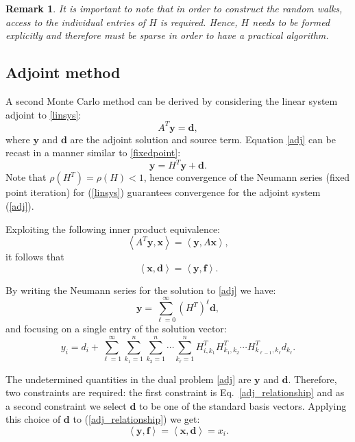 \documentclass[times]{nlaauth}
\newtheorem{rem}{Remark}
\begin{document}
\begin{rem}
It is important to note that in order to construct the random walks,
access to the individual entries of $H$ is required. Hence, $H$ needs to be formed explicitly
and therefore must be sparse in order to have a practical algorithm.
\end{rem}

\subsection{Adjoint method}
\label{subsec:adjoint}

A second Monte Carlo method can be derived by considering the linear system
adjoint to \eqref{linsys}:
\begin{equation}
A^T\mathbf{y}=\mathbf{d},
\label{adj}
\end{equation}
where $\mathbf{y}$ and $\mathbf{d}$ are the adjoint solution and source term.
Equation \eqref{adj} can be recast in a manner similar to \eqref{fixedpoint}:
\[
\mathbf{y} = H^T \mathbf{y} + \mathbf{d}.
\]
Note that $\rho(H^T) = \rho(H) <1$, hence convergence of the Neumann series
(fixed point iteration) for (\ref{linsys}) guarantees convergence
for the adjoint system (\ref{adj}).

Exploiting the following inner product equivalence:
\[
\left\langle
A^T\mathbf{y},\mathbf{x}\right\rangle=\left\langle\mathbf{y},A\mathbf{x}
\right\rangle ,
\]
it follows that
\begin{equation}
\left\langle\mathbf{x},\mathbf{d}\right\rangle=\left\langle\mathbf{y},\mathbf{f}
\right\rangle.
\label{adj_relationship}
\end{equation}

By writing the Neumann series for the solution to \eqref{adj} we have:
\[
\mathbf{y}=\sum_{\ell=0}^{\infty} (H^T)^\ell \mathbf{d},
\]
and focusing on a single entry of the solution vector:
\[
y_i = d_i + \sum_{\ell=1}^{\infty}\sum_{k_1=1}^{n}\sum_{k_2=1}^n
\cdots \sum_{k_{\ell}=1}^n H^T_{i,k_1} H^T_{k_1,k_2}\cdots
H^T_{k_{\ell-1},k_{\ell}} d_{k_\ell}.
\]

The undetermined quantities in the dual problem \eqref{adj} are $\mathbf{y}$
and
$\mathbf{d}$. Therefore, two constraints are required: the first constraint is
Eq.~\eqref{adj_relationship} and as a second constraint we select
$\mathbf{d}$ to be one of the standard basis vectors.
Applying this choice of $\mathbf{d}$ to (\ref{adj_relationship}) we get:
\[
\left\langle\mathbf{y},\mathbf{f}\right\rangle=\left\langle\mathbf{x},\mathbf{d}
\right\rangle=x_i.
\]
\end{document}
